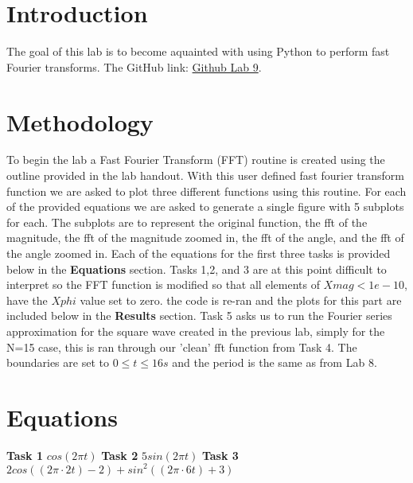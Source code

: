 \documentclass[12pt]{report}
\begin{document}
\section{Introduction}
The goal of this lab is to become aquainted with using Python to perform fast Fourier transforms. 
\newline \newline The GitHub link: \href{https://github.com/CDJohnson279}{Github Lab 9}. 

\section{Methodology}
To begin the lab a Fast Fourier Transform (FFT) routine is created using the outline provided in the lab handout. With this user defined fast fourier transform function we are asked to plot three different functions using this routine. For each of the provided equations we are asked to generate a single figure with 5 subplots for each. The subplots are to represent the original function, the fft of the magnitude, the fft of the magnitude zoomed in, the fft of the angle, and the fft of the angle zoomed in. Each of the equations for the first three tasks is provided below in the \textbf{Equations} section. Tasks 1,2, and 3 are at this point difficult to interpret so the FFT function is modified so that all elements of $Xmag < 1e-10$, have the $Xphi$ value set to zero. the code is re-ran and the plots for this part are included below in the \textbf{Results} section. Task 5 asks us to run the Fourier series approximation for the square wave created in the previous lab, simply for the N=15 case, this is ran through our 'clean' fft function from Task 4. The boundaries are set to $0\leq t\leq 16s$ and the period is the same as from Lab 8. 

\section{Equations}
\textbf{Task 1}\newline\newline
$cos(2 \pi t)$\newline \newline
\textbf{Task 2}\newline\newline
$5sin(2 \pi t)$\newline\newline
\textbf{Task 3} \newline\newline
$2cos((2 \pi · 2t) − 2) + sin^2
((2 \pi · 6t) + 3)$
\end{document}
